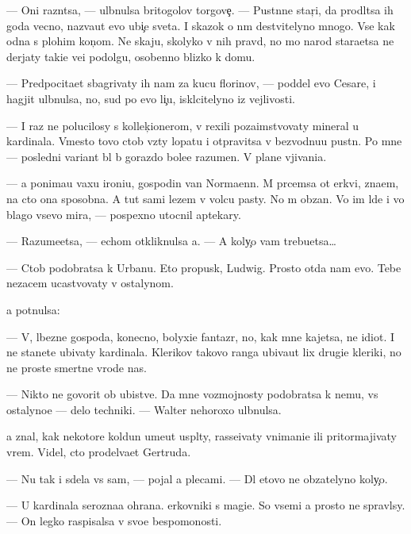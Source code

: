 \documentclass[10pt]{book}
\begin{document}
— Oni razn{\ia}tsa, — ul{\yi}bnulsa britogolov{\yi}{\y} torgove{\c}. — Pust{\yi}nn{\yi}{\y}e star{\c}i, da prodl{\ia}tsa ih goda vecno, naz{\yi}va{\y}ut {\y}evo ubi{\y}{\c}e{\y} sveta. I skazok o n{\e}m de{\y}stvitelyno mnogo. Vse kak odna s plohim kon{\c}om. Ne skaju, skoly\-ko v nih pravd{\yi}, no mo{\y} narod stara{\y}etsa ne derjaty taki{\y}e ve{\x}i podolgu, osobenno blizko k domu.

— Predpocita{\y}et sbagrivaty ih nam za kucu florinov, — poddel {\y}evo Cesare, i hagjit ul{\yi}bnulsa, no, sud{\ia} po {\y}evo li{\c}u, iskl{\io}citelyno iz vejlivosti.

— I raz ne polucilosy s kollek{\c}ionerom, v{\yi} rexili poza{\y}imstvovaty mineral u kardinala. Vmesto tovo ctob{\yi} vz{\ia}ty lopatu i otpravitsa v bezvodnu{\y}u pust{\yi}n{\io}. Po mne — posledni{\y} variant b{\yi}l b{\yi} gorazdo bole{\y}e razumen. V plane v{\yi}jivani{\y}a.

— {\Y}a ponima{\y}u vaxu ironi{\y}u, gospodin van Normaenn. M{\yi} pr{\ia}cemsa ot {\C}erkvi, zna{\y}em, na cto ona sposobna. A tut sami lezem v volc{\y}u pasty. No m{\yi} ob{\ia}zan{\yi}. Vo im{\ia} l{\io}de{\y} i vo blago vsevo mira, — pospexno utocnil aptekary.

— Razume{\y}etsa, — echom otkliknulsa {\y}a. — A koly{\c}o vam trebu{\y}etsa…

— Ctob{\yi} podobratsa k Urbanu. Eto propusk, Ludwig. Prosto otda{\y} nam {\y}evo. Tebe nezacem ucastvovaty v ostalynom.

{\Y}a pot{\ia}nulsa:

— V{\yi}, l{\io}bezn{\yi}{\y}e gospoda, konecno, bolyxi{\y}e fantaz{\e}r{\yi}, no, kak mne kajetsa, ne idiot{\yi}. I ne stanete ubivaty kardinala. Klerikov takovo ranga ubiva{\y}ut lix drugi{\y}e kleriki, no ne prost{\yi}{\y}e smertn{\yi}{\y}e vrode nas.

— Nikto ne govorit ob ubi{\y}stve. Da{\y} mne vozmojnosty podobratsa k nemu, vs{\e} ostalyno{\y}e — delo techniki. — Walter nehoroxo ul{\yi}bnulsa.

{\Y}a znal, kak nekotor{\yi}{\y}e koldun{\yi} ume{\y}ut us{\yi}pl{\ia}ty, rasse{\y}ivaty vnimani{\y}e ili pritormajivaty vrem{\ia}. Videl, cto prodel{\yi}va{\y}et Gertruda.

— Nu tak i sdela{\y} vs{\e} sam, — pojal {\y}a plecami. — Dl{\ia} etovo ne ob{\ia}zatelyno koly{\c}o.

— U kardinala ser{\y}ozna{\y}a ohrana. {\C}erkovniki s magi{\y}e{\y}. So vsemi {\y}a prosto ne spravl{\io}sy. — On legko raspisalsa v svo{\y}e{\y} bespomo{\x}nosti.
\end{document}
